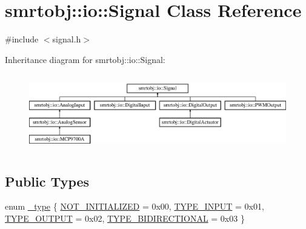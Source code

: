 \hypertarget{classsmrtobj_1_1io_1_1_signal}{}\section{smrtobj\+:\+:io\+:\+:Signal Class Reference}
\label{classsmrtobj_1_1io_1_1_signal}


{\ttfamily \#include $<$signal.\+h$>$}

Inheritance diagram for smrtobj\+:\+:io\+:\+:Signal\+:\begin{figure}[H]
\begin{center}
\leavevmode
\includegraphics[height=3.393939cm]{classsmrtobj_1_1io_1_1_signal}
\end{center}
\end{figure}
\subsection*{Public Types}
\begin{DoxyCompactItemize}
\item 
enum \hyperlink{classsmrtobj_1_1io_1_1_signal_a0566106724452894eae48ec38b66952c}{\+\_\+type} \{ \hyperlink{classsmrtobj_1_1io_1_1_signal_a0566106724452894eae48ec38b66952ca8c9957bb35f431c7299566ecd15b0091}{N\+O\+T\+\_\+\+I\+N\+I\+T\+I\+A\+L\+I\+Z\+E\+D} = 0x00, 
\hyperlink{classsmrtobj_1_1io_1_1_signal_a0566106724452894eae48ec38b66952caccc24da2e76e4a69c273fbfdfa6d059a}{T\+Y\+P\+E\+\_\+\+I\+N\+P\+U\+T} = 0x01, 
\hyperlink{classsmrtobj_1_1io_1_1_signal_a0566106724452894eae48ec38b66952ca1cd32fb0f22887a6df6296f849d035ff}{T\+Y\+P\+E\+\_\+\+O\+U\+T\+P\+U\+T} = 0x02, 
\hyperlink{classsmrtobj_1_1io_1_1_signal_a0566106724452894eae48ec38b66952caf8a436cfbf1fd32224a08b8fbff821a9}{T\+Y\+P\+E\+\_\+\+B\+I\+D\+I\+R\+E\+C\+T\+I\+O\+N\+A\+L} = 0x03
 \}
\end{DoxyCompactItemize}

